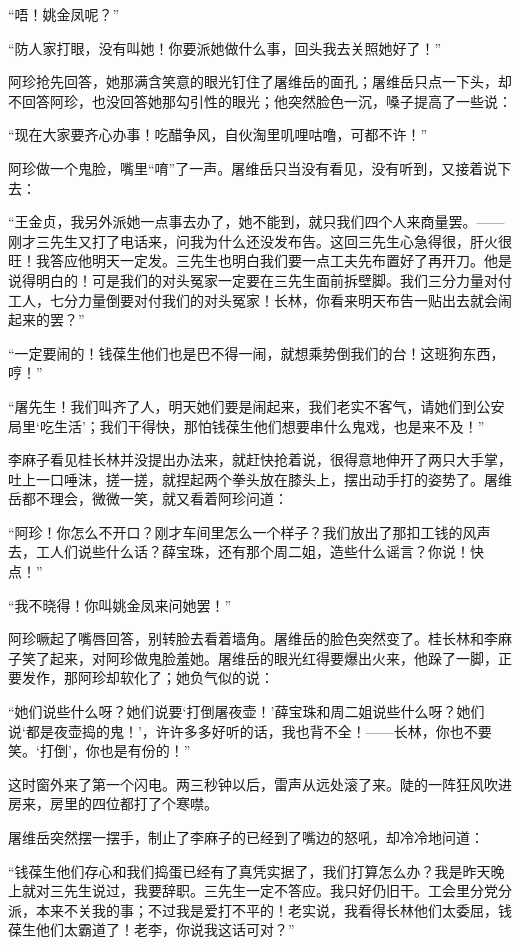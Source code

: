 \par “唔！姚金凤呢？”
\par “防人家打眼，没有叫她！你要派她做什么事，回头我去关照她好了！”
\par 阿珍抢先回答，她那满含笑意的眼光钉住了屠维岳的面孔；屠维岳只点一下头，却不回答阿珍，也没回答她那勾引性的眼光；他突然脸色一沉，嗓子提高了一些说：
\par “现在大家要齐心办事！吃醋争风，自伙淘里叽哩咕噜，可都不许！”
\par 阿珍做一个鬼脸，嘴里“唷”了一声。屠维岳只当没有看见，没有听到，又接着说下去：
\par “王金贞，我另外派她一点事去办了，她不能到，就只我们四个人来商量罢。——刚才三先生又打了电话来，问我为什么还没发布告。这回三先生心急得很，肝火很旺！我答应他明天一定发。三先生也明白我们要一点工夫先布置好了再开刀。他是说得明白的！可是我们的对头冤家一定要在三先生面前拆壁脚。我们三分力量对付工人，七分力量倒要对付我们的对头冤家！长林，你看来明天布告一贴出去就会闹起来的罢？”
\par “一定要闹的！钱葆生他们也是巴不得一闹，就想乘势倒我们的台！这班狗东西，哼！”
\par “屠先生！我们叫齐了人，明天她们要是闹起来，我们老实不客气，请她们到公安局里‘吃生活’；我们干得快，那怕钱葆生他们想要串什么鬼戏，也是来不及！”
\par 李麻子看见桂长林并没提出办法来，就赶快抢着说，很得意地伸开了两只大手掌，吐上一口唾沫，搓一搓，就捏起两个拳头放在膝头上，摆出动手打的姿势了。屠维岳都不理会，微微一笑，就又看着阿珍问道：
\par “阿珍！你怎么不开口？刚才车间里怎么一个样子？我们放出了那扣工钱的风声去，工人们说些什么话？薛宝珠，还有那个周二姐，造些什么谣言？你说！快点！”
\par “我不晓得！你叫姚金凤来问她罢！”
\par 阿珍噘起了嘴唇回答，别转脸去看着墙角。屠维岳的脸色突然变了。桂长林和李麻子笑了起来，对阿珍做鬼脸羞她。屠维岳的眼光红得要爆出火来，他跺了一脚，正要发作，那阿珍却软化了；她负气似的说：
\par “她们说些什么呀？她们说要‘打倒屠夜壶！’薛宝珠和周二姐说些什么呀？她们说‘都是夜壶捣的鬼！’，许许多多好听的话，我也背不全！——长林，你也不要笑。‘打倒’，你也是有份的！”
\par 这时窗外来了第一个闪电。两三秒钟以后，雷声从远处滚了来。陡的一阵狂风吹进房来，房里的四位都打了个寒噤。
\par 屠维岳突然摆一摆手，制止了李麻子的已经到了嘴边的怒吼，却冷冷地问道：
\par “钱葆生他们存心和我们捣蛋已经有了真凭实据了，我们打算怎么办？我是昨天晚上就对三先生说过，我要辞职。三先生一定不答应。我只好仍旧干。工会里分党分派，本来不关我的事；不过我是爱打不平的！老实说，我看得长林他们太委屈，钱葆生他们太霸道了！老李，你说我这话可对？”
